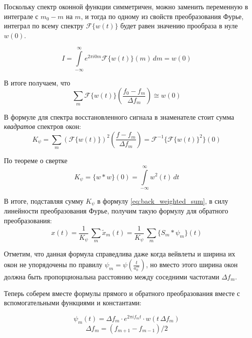 Поскольку спектр оконной функции симметричен, можно заменить переменную в интеграле с $m_0 - m$ на $m$, 
и тогда по одному из свойств преобразования Фурье, интеграл по всему спектру $\mathcal{F}\{w(t)\}$ будет равен значению прообраза в нуле $w(0)$.

\begin{equation}
  I = 
  \int \limits_{-\infty}^\infty e^{2\pi i 0 m} \mathcal{F}\{w(t)\} (m) \, dm = w(0)
\end{equation}

В итоге получаем, что 
\begin{equation}
  \sum \limits_m \mathcal{F}\{w(t)\} \left(\frac{f_0 - f_m}{\Delta f_m}\right)  \cong  w(0)
\end{equation}

В формуле для спектра восстановленного сигнала в знаменателе стоит сумма \textit{квадратов} спектров окон:
\begin{equation}
  K_{\psi} = \sum \limits_m (\mathcal{F}\{w(t)\})^2 \left(\frac{f - f_m}{\Delta f_m}\right) = \mathcal{F}^{-1}\{\mathcal{F}\{w(t)\}^2\}(0)
\end{equation}

По теореме о свертке
\begin{equation}
  K_{\psi} = \{w * w\}(0) = \int \limits_{-\infty}^\infty w^2(t) \, dt
\end{equation}

В итоге, подставляя сумму $K_{\psi}$ в формулу \ref{eq:back_weighted_sum}, в силу линейности преобразования Фурье, 
получим такую формулу для обратного преобразования:
\begin{equation}
  x(t) = \frac{1}{K_{\psi}} \, \sum \limits_m \tilde{x}_m(t) = \frac{1}{K_{\psi}} \, \sum \limits_m \{S_m * \psi_m\}(t)
\end{equation}

Отметим, что данная формула справедлива даже когда вейвлеты и ширина их окон не упорядочены по правилу $\psi_m = \psi(\frac{t}{a_0^m})$, 
но вместо этого ширина окон должна быть пропорциональна расстоянию между соседними частотами $\Delta f_m$.

Теперь соберем вместе формулы прямого и обратного преобразования вместе с вспомогательными функциями и константами:

\begin{equation}
  \psi_m(t) = \Delta f_m \cdot e^{2\pi i f_m t} \cdot w(t\,\Delta f_m)
  \label{eq:psi_wavelet_final}
\end{equation}
\begin{equation}
  \Delta f_m = (f_{m+1} - f_{m-1}) / 2
\end{equation}

